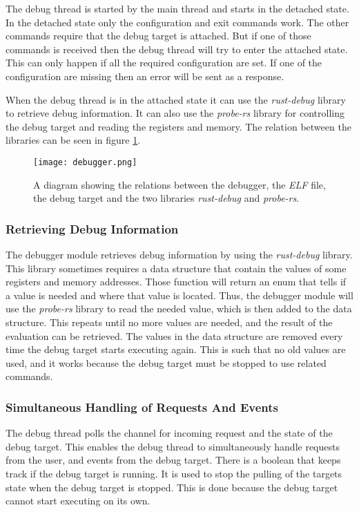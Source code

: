 The debug thread is started by the main thread and starts in the detached state.
In the detached state only the configuration and exit commands work.
The other commands require that the debug target is attached.
But if one of those commands is received then the debug thread will try to enter the attached state.
This can only happen if all the required configuration are set.
If one of the configuration are missing then an error will be sent as a response.


When the debug thread is in the attached state it can use the \emph{rust-debug} library to retrieve debug information.
It can also use the \emph{probe-rs} library for controlling the debug target and reading the registers and memory.
The relation between the libraries can be seen in figure \ref{fig:debugger}.


\begin{figure}[h]
	\centering
	\texttt{[image: debugger.png]}
	\caption{A diagram showing the relations between the debugger, the \emph{ELF} file, the debug target and the two libraries \emph{rust-debug} and \emph{probe-rs}.}
	\label{fig:debugger}
\end{figure}


\subsubsection{Retrieving Debug Information}
The debugger module retrieves debug information by using the \emph{rust-debug} library.
This library sometimes requires a data structure that contain the values of some registers and memory addresses.
Those function will return an enum that tells if a value is needed and where that value is located.
Thus, the debugger module will use the \emph{probe-rs} library to read the needed value, which is then added to the data structure.
This repeats until no more values are needed, and the result of the evaluation can be retrieved.
The values in the data structure are removed every time the debug target starts executing again.
This is such that no old values are used, and it works because the debug target must be stopped to use related commands.



\subsubsection{Simultaneous Handling of Requests And Events}
The debug thread polls the channel for incoming request and the state of the debug target.
This enables the debug thread to simultaneously handle requests from the user, and events from the debug target.
There is a boolean that keeps track if the debug target is running.
It is used to stop the pulling of the targets state when the debug target is stopped.
This is done because the debug target cannot start executing on its own.


